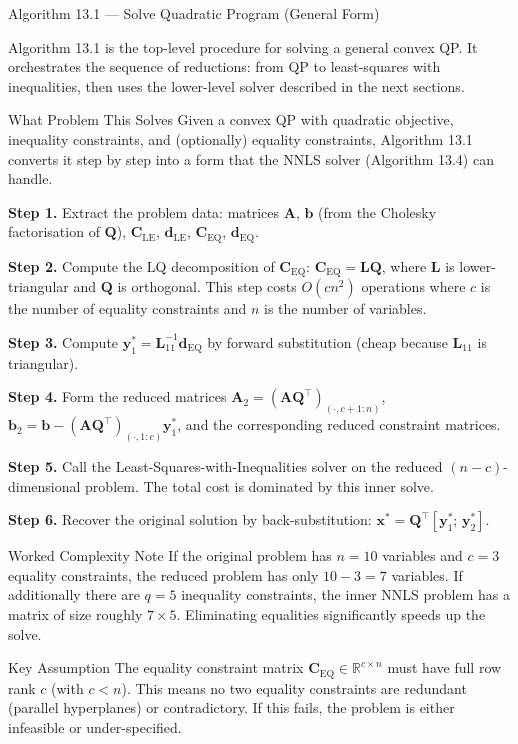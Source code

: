 \documentclass[aspectratio=169,10pt]{beamer}
\newcommand{\bx}{\mathbf{x}}
\newcommand{\bb}{\mathbf{b}}
\newcommand{\bA}{\mathbf{A}}
\newcommand{\bC}{\mathbf{C}}
\newcommand{\bd}{\mathbf{d}}
\newcommand{\bQ}{\mathbf{Q}}
\newcommand{\R}{\mathbb{R}}
\begin{document}
\begin{frame}[allowframebreaks]{Algorithm 13.1 --- Solve Quadratic Program (General Form)}

  Algorithm 13.1 is the top-level procedure for solving a general convex QP.
  It orchestrates the sequence of reductions: from QP to least-squares with
  inequalities, then uses the lower-level solver described in the next sections.

  \begin{alertblock}{What Problem This Solves}
    Given a convex QP with quadratic objective, inequality constraints, and
    (optionally) equality constraints, Algorithm 13.1 converts it step by step
    into a form that the NNLS solver (Algorithm 13.4) can handle.
  \end{alertblock}

  \textbf{Step 1.}  Extract the problem data: matrices $\bA$, $\bb$ (from the
  Cholesky factorisation of $\bQ$), $\bC_{\text{LE}}$, $\bd_{\text{LE}}$,
  $\bC_{\text{EQ}}$, $\bd_{\text{EQ}}$.

  \textbf{Step 2.}  Compute the LQ decomposition of $\bC_{\text{EQ}}$:
  $\bC_{\text{EQ}} = \mathbf{L}\mathbf{Q}$, where $\mathbf{L}$ is
  lower-triangular and $\mathbf{Q}$ is orthogonal.  This step costs
  $O(cn^2)$ operations where $c$ is the number of equality constraints and
  $n$ is the number of variables.

  \textbf{Step 3.}  Compute $\mathbf{y}_1^* = \mathbf{L}_{11}^{-1}\bd_{\text{EQ}}$
  by forward substitution (cheap because $\mathbf{L}_{11}$ is triangular).

  \textbf{Step 4.}  Form the reduced matrices $\bA_2 = (\bA\mathbf{Q}^{\top})_{(\cdot,c+1:n)}$,
  $\bb_2 = \bb - (\bA\mathbf{Q}^{\top})_{(\cdot,1:c)}\mathbf{y}_1^*$, and the
  corresponding reduced constraint matrices.

  \textbf{Step 5.}  Call the Least-Squares-with-Inequalities solver on the reduced
  $(n-c)$-dimensional problem.  The total cost is dominated by this inner solve.

  \textbf{Step 6.}  Recover the original solution by back-substitution:
  $\bx^* = \mathbf{Q}^{\top}[\mathbf{y}_1^*;\, \mathbf{y}_2^*]$.

  \begin{exampleblock}{Worked Complexity Note}
    If the original problem has $n = 10$ variables and $c = 3$ equality constraints,
    the reduced problem has only $10 - 3 = 7$ variables.  If additionally there are
    $q = 5$ inequality constraints, the inner NNLS problem has a matrix of size
    roughly $7 \times 5$.  Eliminating equalities significantly speeds up the solve.
  \end{exampleblock}

  \begin{block}{Key Assumption}
    The equality constraint matrix $\bC_{\text{EQ}} \in \R^{c\times n}$ must have
    full row rank $c$ (with $c < n$).  This means no two equality constraints are
    redundant (parallel hyperplanes) or contradictory.  If this fails, the problem
    is either infeasible or under-specified.
  \end{block}

\end{frame}
\end{document}
